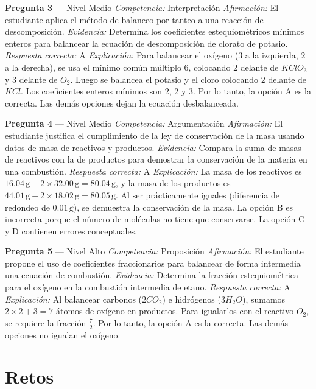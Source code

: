 \documentclass[
  spanish,
  letterpaper,
  12pt,
  oneside,
  open=any]{scrbook}
\newcommand{\setcolorsection}[2]{%
  \definecolor{currentsectionbg}{HTML}{#1}%
  \definecolor{currentsectionborder}{HTML}{#2}%
}
\begin{document}
\textbf{Pregunta 3} --- Nivel Medio \emph{Competencia:} Interpretación
\emph{Afirmación:} El estudiante aplica el método de balanceo por tanteo
a una reacción de descomposición. \emph{Evidencia:} Determina los
coeficientes estequiométricos mínimos enteros para balancear la ecuación
de descomposición de clorato de potasio. \emph{Respuesta correcta:} A
\emph{Explicación:} Para balancear el oxígeno (\(3\) a la izquierda,
\(2\) a la derecha), se usa el mínimo común múltiplo \(6\), colocando
\(2\) delante de \(K{Cl}O_3\) y \(3\) delante de \(O_2\). Luego se
balancea el potasio y el cloro colocando \(2\) delante de \(K{Cl}\). Los
coeficientes enteros mínimos son \(2\), \(2\) y \(3\). Por lo tanto, la
opción A es la correcta. Las demás opciones dejan la ecuación
desbalanceada.

\textbf{Pregunta 4} --- Nivel Medio \emph{Competencia:} Argumentación
\emph{Afirmación:} El estudiante justifica el cumplimiento de la ley de
conservación de la masa usando datos de masa de reactivos y productos.
\emph{Evidencia:} Compara la suma de masas de reactivos con la de
productos para demostrar la conservación de la materia en una
combustión. \emph{Respuesta correcta:} A \emph{Explicación:} La masa de
los reactivos es
\(16.04\,\text{g} + 2 \times 32.00\,\text{g} = 80.04\,\text{g}\), y la
masa de los productos es
\(44.01\,\text{g} + 2 \times 18.02\,\text{g} = 80.05\,\text{g}\). Al ser
prácticamente iguales (diferencia de redondeo de \(0.01\,\text{g}\)), se
demuestra la conservación de la masa. La opción B es incorrecta porque
el número de moléculas no tiene que conservarse. La opción C y D
contienen errores conceptuales.

\textbf{Pregunta 5} --- Nivel Alto \emph{Competencia:} Proposición
\emph{Afirmación:} El estudiante propone el uso de coeficientes
fraccionarios para balancear de forma intermedia una ecuación de
combustión. \emph{Evidencia:} Determina la fracción estequiométrica para
el oxígeno en la combustión intermedia de etano. \emph{Respuesta
correcta:} A \emph{Explicación:} Al balancear carbonos (\(2CO_2\)) e
hidrógenos (\(3H_2O\)), sumamos \(2 \times 2 + 3 = 7\) átomos de oxígeno
en productos. Para igualarlos con el reactivo \(O_2\), se requiere la
fracción \(\frac{7}{2}\). Por lo tanto, la opción A es la correcta. Las
demás opciones no igualan el oxígeno.

\setcolorsection{f6d5a8}{e8c490}

\section{Retos}\label{retos-1}
\end{document}
